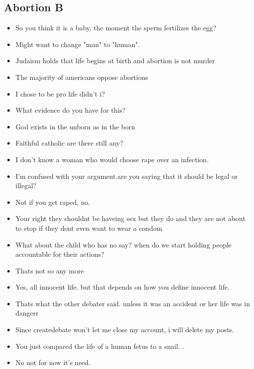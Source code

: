 \documentclass[tikz]{article}
\begin{document}
\begin{multicols}{2}
    \vfill
    \columnbreak

    \subsection*{Abortion B}
    \begin{itemize}[noitemsep,nolistsep,label={}]
      \item{So you think it is a baby, the moment the sperm fertilizes the egg?}
      \item{Might want to change "man" to "human".}
      \item{Judaism holds that life begins at birth and abortion is not murder}
      \item{The majority of americans oppose abortions}
      \item{I chose to be pro life didn't i?}
      \item{What evidence do you have for this?}
      \item{God exists in the unborn as in the born}
      \item{Faithful catholic are there still any?}
      \item{I don't know a woman who would choose rape over an infection.}
      \item{I'm confused with your argument.are you saying that it should be legal or illegal?}
      \item{Not if you get raped, no.}
      \item{Your right they shouldnt be haveing sex but they do and they are not about to stop if they dont even want to wear a condom}
      \item{What about the child who has no say? when do we start holding people accountable for their actions?}
      \item{Thats not so any more}
      \item{Yes, all innocent life. but that depends on how you define innocent life.}
      \item{Thats what the other debater said. unless it was an accident or her life was in dangerr}
      \item{Since createdebate won't let me close my account, i will delete my posts.}
      \item{You just compared the life of a human fetus to a snail. .}
      \item{No not for now it's need.}

\end{itemize}
\end{multicols}
\end{document}
